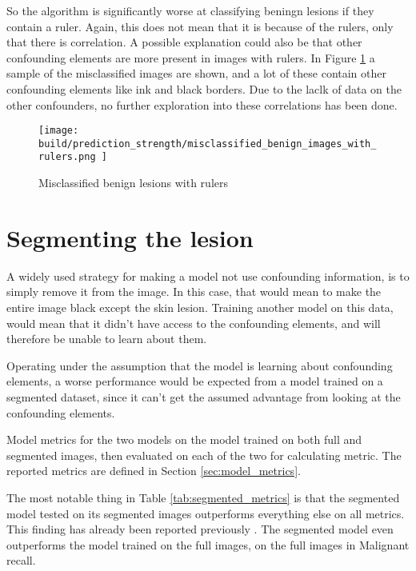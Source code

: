So the algorithm is significantly worse at classifying beningn lesions if they contain a ruler.
Again, this does not mean that it is because of the rulers, only that there is correlation.
A possible explanation could also be that other confounding elements are more present in images with rulers.
In Figure \ref{fig:prediction_strength_ruler_misclassified_benign} a sample of the misclassified images are shown,
and a lot of these contain other confounding elements like ink and black borders.
Due to the laclk of data on the other confounders, no further exploration into these correlations has been done.

\begin{figure}
    \centering
    \texttt{[image: 
        build/prediction\_strength/misclassified\_benign\_images\_with\_rulers.png
    ]}
    \caption{Misclassified benign lesions with rulers}
    \label{fig:prediction_strength_ruler_misclassified_benign}
\end{figure}

\section{Segmenting the lesion}
A widely used strategy for making a model not use confounding information, is to simply remove it from the image.
In this case, that would mean to make the entire image black except the skin lesion.
Training another model on this data, would mean that it didn't have access to the confounding elements, 
and will therefore be unable to learn about them.

Operating under the assumption that the model is learning about confounding elements,
a worse performance would be expected from a model trained on a segmented dataset,
since it can't get the assumed advantage from looking at the confounding elements.

\begin{table}
    
    \caption{Model metrics for the two models on the model trained on both full and segmented images,
                then evaluated on each of the two for calculating metric.
                The reported metrics are defined in Section \ref{sec:model_metrics}.
    }
    \label{tab:segmented_metrics}
\end{table}

The most notable thing in Table \ref{tab:segmented_metrics} is that the segmented model tested
on its segmented images outperforms everything else on all metrics.
This finding has already been reported previously \cite{segmenting-improves-performance}.
The segmented model even outperforms the model trained on the full images, on the full images in Malignant recall.
